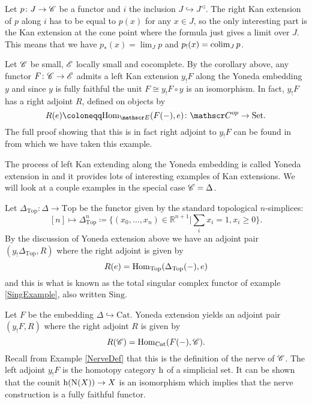 \documentclass[../../thesis.tex]{subfiles}
\begin{document}
\begin{example}\label{KanCone}
    Let $ p \colon J \to \mathscr{C}$ be a functor and $i$ the inclusion $J \hookrightarrow J^{\triangleleft}$.
    The right Kan extension of $p$ along $i$ has to be equal to $p(x)$ for any $x \in J$, so the only interesting part is the Kan extension at the cone point where the formula just gives a limit over $J$.
    This means that we have $p_*(x) = \lim_J p$ and $p_!(x) = \operatorname*{colim}_J p $.
\end{example}
\begin{example}
    Let $\mathscr{C}$ be small, $\mathscr{E}$ locally small and cocomplete.
    By the corollary above, any functor $F\colon \mathscr{C} \to \mathscr{E}$ admits a left Kan extension $y_!F$ along the Yoneda embedding $y$ and since $y$ is fully faithful the unit $F \cong y_!F\circ y$ is an isomorphism.
    In fact, $y_!F$ has a right adjoint $R$, defined on objects by
    \[
        R(e) \coloneqq \Hom_{\E}(F(\blank), e) \colon \C^{op} \to \SET.
    \]
    The full proof showing that this is in fact right adjoint to $y_!F$ can be found in \cite[Remark 6.5.9.]{CatContext} from which we have taken this example.
\end{example}
The process of left Kan extending along the Yoneda embedding is called Yoneda extension in \cite[pp.62-64]{CatsSheaves} and it provides lots of interesting examples of Kan extensions.
We will look at a couple examples in the special case $\mathscr{C} = \Delta$.
\begin{example}
    Let $\Delta_{\mathrm{Top}} \colon \Delta \to \mathrm{Top}$ be the functor given by the standard topological $n$-simplices:
    \[
        [n] \mapsto \Delta^n_{\mathrm{Top}} \coloneqq \{(x_0, \dots , x_n) \in \mathbb{R}^{n+1} | \sum_{i}x_i = 1, x_i \geq 0\}  .
    \]
    By the discussion of Yoneda extension above we have an adjoint pair $(y_!\Delta_{\mathrm{Top}}, R)$ where the right adjoint is given by
    \[
        R(e) = \mathrm{Hom}_{\mathrm{Top}}(\Delta_{\mathrm{Top}}({-}), e)
    \]
    and this is what is known as the total singular complex functor of example \ref{SingExample}, also written $\mathrm{Sing}$.
\end{example}
\begin{example}\label{NerveKan}
    Let $F$ be the embedding $\Delta \hookrightarrow \mathrm{Cat}$.
    Yoneda extension yields an adjoint pair $(y_!F, R)$ where the right adjoint $R$ is given by
    \[
        R(\mathscr{C}) = \mathrm{Hom}_{\mathrm{Cat}}(F({-}), \mathscr{C}).
    \]
    Recall from Example \ref{NerveDef} that this is the definition of the nerve of $\mathscr{C}$.
    The left adjoint $y_!F$ is the homotopy category $\mathrm{h}$ of a simplicial set.
    It can be shown that the counit $\mathrm{h}(\mathrm{N}(X)) \to X$ is an isomorphism which implies that the nerve construction is a fully faithful functor.
\end{example}
\end{document}
